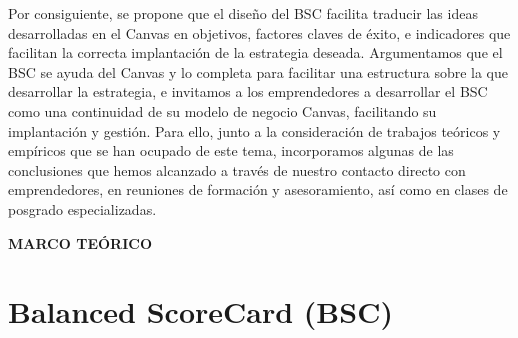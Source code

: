 \documentclass[10pt,a4paper]{article}
\begin{document}
		Por consiguiente, se propone que el diseño del BSC facilita traducir las ideas desarrolladas en el Canvas en objetivos, factores claves de éxito, e indicadores que facilitan la correcta implantación de la estrategia deseada. Argumentamos que el BSC se ayuda del Canvas y lo completa para facilitar una estructura sobre la que desarrollar la estrategia, e invitamos a los emprendedores a desarrollar el BSC como una continuidad de su modelo de negocio Canvas, facilitando su implantación y gestión. Para ello, junto a la consideración de trabajos teóricos y empíricos que se han ocupado de este tema, incorporamos algunas de las conclusiones que hemos alcanzado a través de nuestro contacto directo con emprendedores, en reuniones de formación y asesoramiento, así como en clases de posgrado especializadas.
		
		\vspace{\baselineskip}
		
		\begin{center}
			\textbf{MARCO TEÓRICO}
		\end{center}
			
		\section{Balanced ScoreCard (BSC)}	
		
\end{document}
